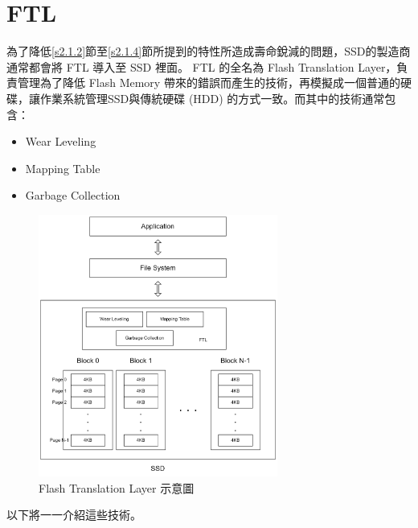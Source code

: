 \section{FTL}\label{s2.2}
\indent
為了降低\ref{s2.1.2}節至\ref{s2.1.4}節所提到的特性所造成壽命銳減的問題，SSD的製造商通常都會將 FTL 導入至 SSD 裡面。
FTL 的全名為 Flash Translation Layer，負責管理為了降低 Flash Memory 帶來的錯誤而產生的技術，再模擬成一個普通的硬碟，讓作業系統管理SSD與傳統硬碟 (HDD) 的方式一致。而其中的技術通常包含：\cite{Boukhobza2014ASA}
\begin{itemize}
    \item Wear Leveling
    \item Mapping Table
    \item Garbage Collection
\end{itemize}
\begin{figure}[H]
    \centering
    \includegraphics[width=0.7\textwidth]{picture/ch2/FTL.png}
    \caption{Flash Translation Layer 示意圖}
    \label{f2.4}
\end{figure}
以下將一一介紹這些技術。


